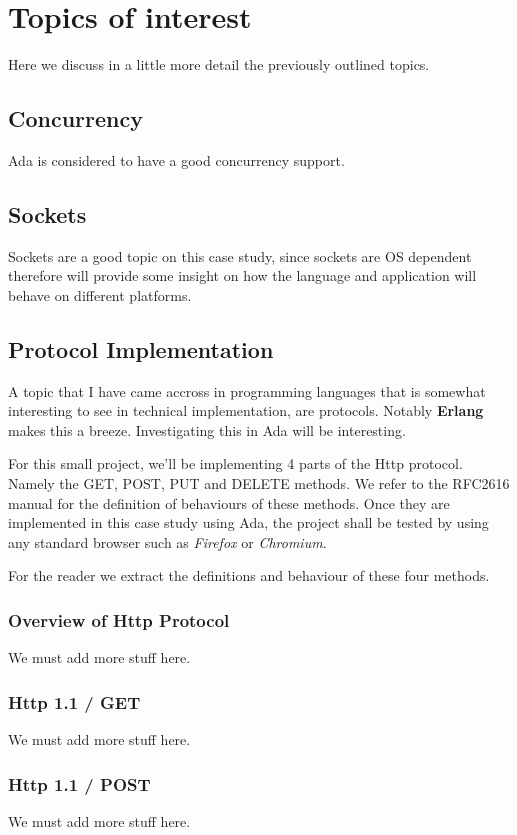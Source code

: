\section{Topics of interest}
Here we discuss in a little more detail the previously outlined topics.

\subsection{Concurrency}
Ada is considered to have a good concurrency support. 

\subsection{Sockets}
Sockets are a good topic on this case study, since sockets are OS dependent
therefore will provide some insight on how the language and application will
behave on different platforms. 

\subsection{Protocol Implementation}
A topic that I have came accross in programming languages that is somewhat
interesting to see in technical implementation, are protocols. Notably 
\textbf{Erlang} makes this a breeze. Investigating this in Ada will be 
interesting. 

For this small project, we'll be implementing 4 parts of the Http protocol. 
Namely the GET, POST, PUT and DELETE methods. We refer to the RFC2616 manual 
for the definition of behaviours of these methods. Once they are implemented in
this case study using Ada, the project shall be tested by using any standard
browser such as \textit{Firefox} or \textit{Chromium}.

For the reader we extract the definitions and behaviour of these four methods.
\subsubsection{Overview of Http Protocol}
We must add more stuff here.

\subsubsection{Http 1.1 / GET}
We must add more stuff here.

\subsubsection{Http 1.1 / POST}
We must add more stuff here.

